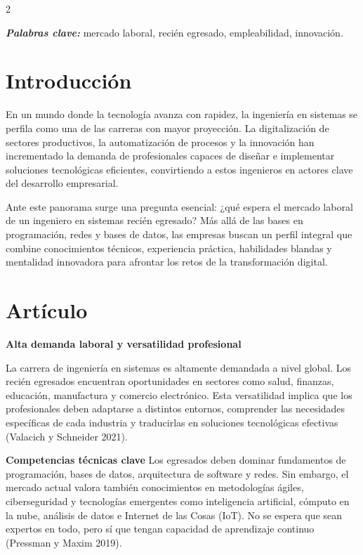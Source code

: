\documentclass[12pt,spanish,Letterpaper,openany]{book}
\begin{document}
\begin {multicols}{2}

\textbf{\emph{Palabras clave:}} mercado laboral, recién egresado, empleabilidad, innovación.

\section{Introducción}\label{introducciuxf3n-8}

En un mundo donde la tecnología avanza con rapidez, la ingeniería en sistemas se perfila como una de las carreras con mayor proyección. La digitalización de sectores productivos, la automatización de procesos y la innovación han incrementado la demanda de profesionales capaces de diseñar e implementar soluciones tecnológicas eficientes, convirtiendo a estos ingenieros en actores clave del desarrollo empresarial.

Ante este panorama surge una pregunta esencial: ¿qué espera el mercado laboral de un ingeniero en sistemas recién egresado? Más allá de las bases en programación, redes y bases de datos, las empresas buscan un perfil integral que combine conocimientos técnicos, experiencia práctica, habilidades blandas y mentalidad innovadora para afrontar los retos de la transformación digital.

\section{Artículo}\label{artuxedculo-8}

\bigskip

\textbf{Alta demanda laboral y versatilidad profesional}

La carrera de ingeniería en sistemas es altamente demandada a nivel global. Los recién egresados encuentran oportunidades en sectores como salud, finanzas, educación, manufactura y comercio electrónico. Esta versatilidad implica que los profesionales deben adaptarse a distintos entornos, comprender las necesidades específicas de cada industria y traducirlas en soluciones tecnológicas efectivas (Valacich y Schneider 2021).

\textbf{Competencias técnicas clave}
Los egresados deben dominar fundamentos de programación, bases de datos, arquitectura de software y redes. Sin embargo, el mercado actual valora también conocimientos en metodologías ágiles, ciberseguridad y tecnologías emergentes como inteligencia artificial, cómputo en la nube, análisis de datos e Internet de las Cosas (IoT). No se espera que sean expertos en todo, pero sí que tengan capacidad de aprendizaje continuo (Pressman y Maxim 2019).


\end{multicols}
\end{document}
